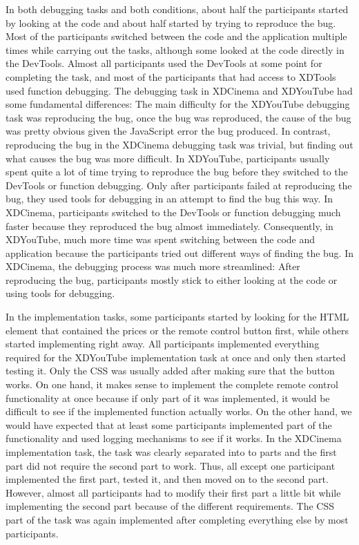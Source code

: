 In both debugging tasks and both conditions, about half the participants started by looking at the code and about half started by trying to reproduce the bug. Most of the participants switched between the code and the application multiple times while carrying out the tasks, although some looked at the code directly in the DevTools. Almost all participants used the DevTools at some point for completing the task, and most of the participants that had access to XDTools used function debugging. The debugging task in XDCinema and XDYouTube had some fundamental differences: The main difficulty for the XDYouTube debugging task was reproducing the bug, once the bug was reproduced, the cause of the bug was pretty obvious given the JavaScript error the bug produced. In contrast, reproducing the bug in the XDCinema debugging task was trivial, but finding out what causes the bug was more difficult. In XDYouTube, participants usually spent quite a lot of time trying to reproduce the bug before they switched to the DevTools or function debugging. Only after participants failed at reproducing the bug, they used tools for debugging in an attempt to find the bug this way. In XDCinema, participants switched to the DevTools or function debugging much faster because they reproduced the bug almost immediately. Consequently, in XDYouTube, much more time was spent switching between the code and application because the participants tried out different ways of finding the bug. In XDCinema, the debugging process was much more streamlined: After reproducing the bug, participants mostly stick to either looking at the code or using tools for debugging.

In the implementation tasks, some participants started by looking for the HTML element that contained the prices or the remote control button first, while others started implementing right away. All participants implemented everything required for the XDYouTube implementation task at once and only then started testing it. Only the CSS was usually added after making sure that the button works. On one hand, it makes sense to implement the complete remote control functionality at once because if only part of it was implemented, it would be difficult to see if the implemented function actually works. On the other hand, we would have expected that at least some participants implemented part of the functionality and used logging mechanisms to see if it works. In the XDCinema implementation task, the task was clearly separated into to parts and the first part did not require the second part to work. Thus, all except one participant implemented the first part, tested it, and then moved on to the second part. However, almost all participants had to modify their first part a little bit while implementing the second part because of the different requirements. The CSS part of the task was again implemented after completing everything else by most participants.

